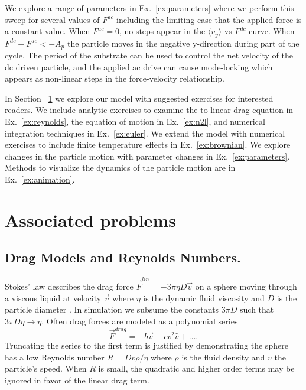 \documentclass[twocolumn,preprintnumbers,amsmath,amssymb,aps,prx]{revtex4}
\begin{document}
We explore a range of parameters in Ex.~\ref{ex:parameters}
where 
we perform this sweep for several values
of $F^{ac}$ including the limiting case that the applied force
is a constant value.
When $F^{ac} = 0$, no steps appear
in the $\langle v_y \rangle $ vs $F^{dc}$ curve. 
When $F^{dc} - F^{ac} < -A_p$ the particle
moves in the negative y-direction 
during part of the cycle.
The period of the substrate
can be used to control the
net velocity of the dc driven particle,
and the applied ac drive can cause mode-locking
which appears as non-linear 
steps in the force-velocity relationship.

In Section ~\ref{sec:problems}
we explore our model
with suggested exercises for interested readers.
We include analytic exercises to examine the 
to linear drag equation in Ex.~\ref{ex:reynolds}, 
the equation of motion in Ex.~\ref{ex:n2l},
and 
numerical integration techniques in Ex.~\ref{ex:euler}.
We extend the model with
numerical exercises %
to include finite temperature effects
in Ex.~\ref{ex:brownian}.
We explore changes in the particle motion
with parameter changes in Ex.~\ref{ex:parameters}.
Methods to visualize the dynamics of the particle motion
are in Ex.~\ref{ex:animation}.

\section{Associated problems}
\label{sec:problems}	%

\subsection{Drag Models and Reynolds Numbers.}
Stokes' law describes the drag force
$\vec{F}^{lin} = -3 \pi \eta D \vec{v}$ 
on a sphere
moving through a viscous liquid at velocity $\vec{v}$ 
  where $\eta$ is the dynamic fluid viscosity and 
  $D$ is the particle diameter \cite{Taylor2005}.
  In simulation we
  subsume the constants $3 \pi D$
  such that $3 \pi D \eta \rightarrow \eta $.
  Often drag forces are
  modeled as a polynomial series ~\cite{Taylor2005}
  \begin{equation}
    \vec{F}^{drag} = -b \vec{v} - c v^2 \hat{v} + \ldots  .
  \end{equation}
  Truncating the series to the first term
  is justified by demonstrating the sphere
  has a low Reynolds number  
  $R = D v \rho / \eta$
  where $\rho$ is the fluid density and $v$ the particle's speed.
  When $R$ is small, the quadratic and higher order terms
  may be ignored in favor of the linear drag term.
\end{document}
